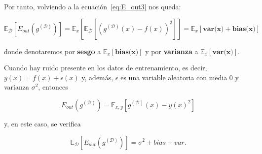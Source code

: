 Por tanto, volviendo a la ecuación~\eqref{eq:E_out3} nos queda:

\begin{equation}\label{eq:E_out8}
    \mathbb{E}_{\mathcal{D}}[E_{out}(g^{\mathcal{(D)}})] = \mathbb{E}_{x}[\mathbb{E}_{\mathcal{D}}[{(g^{\mathcal{(D)}}(x) - f(x))}^2]] = \mathbb{E}_{x}[\textbf{var(x)} + \textbf{bias(x)}]
\end{equation}

donde denotaremos por \textbf{sesgo} a $\mathbb{E}_{x}[\textbf{bias(x)}]$ y por \textbf{varianza} a $\mathbb{E}_{x}[\textbf{var(x)}]$.\newline

\begin{observacion}
    Cuando hay ruido presente en los datos de entrenamiento, es decir, $y(x) = f(x) + \epsilon(x)$ y, además, $\epsilon$ es una variable aleatoria con media $0$ y varianza $\sigma^{2}$, entonces

    \[ E_{out}(g^{(\mathcal{D})}) = \mathbb{E}_{x, y}[g^{(\mathcal{D})}(x)-{y(x)}^{2}] \]

    y, en este caso, se verifica

    \[ \mathbb{E}_{\mathcal{D}}[E_{out}(g^{(\mathcal{D})})] = \sigma^{2} + bias + var. \]
\end{observacion}

